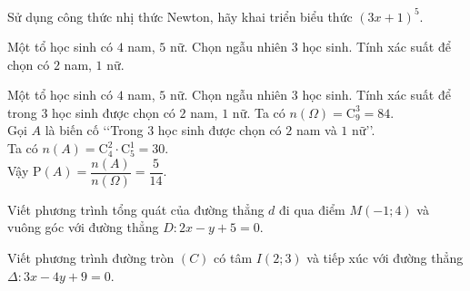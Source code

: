 \begin{bt}%
Sử dụng công thức nhị thức Newton, hãy khai triển biểu thức $(3x+1)^5$.
\end{bt}

\begin{bt}%
Một tổ học sinh có $4$ nam, $5$ nữ. Chọn ngẫu nhiên $3$ học sinh. Tính xác suất để chọn có $2$ nam, $1$ nữ.
\end{bt}

\begin{bt}%
	Một tổ học sinh có $4$ nam, $5$ nữ. Chọn ngẫu nhiên $3$ học sinh. Tính xác suất để trong $3$ học sinh được chọn có $2$ nam, $1$ nữ.
	\loigiai
	{
		Ta có $n(\Omega)=\mathrm{C}^3_9=84$.\\
		Gọi $A$ là biến cố \lq\lq Trong $3$ học sinh được chọn có $2$ nam và $1$ nữ\rq\rq. \\
		Ta có $n(A)=\mathrm{C}^2_4\cdot \mathrm{C}^1_5=30$.\\
		Vậy $\mathrm{P}(A)=\dfrac{n(A)}{n(\Omega)}=\dfrac{5}{14}$.
	}
\end{bt}
\begin{bt}%
	Viết phương trình tổng quát của đường thẳng $d$ đi qua điểm $M(-1;4)$ và vuông góc với đường thẳng $D\colon 2x-y+5=0$.
\end{bt}
\begin{bt}%
	Viết phương trình đường tròn $(C)$ có tâm $I(2;3)$ và tiếp xúc với đường thẳng $\Delta \colon 3x-4y+9=0$. \\
\end{bt}

